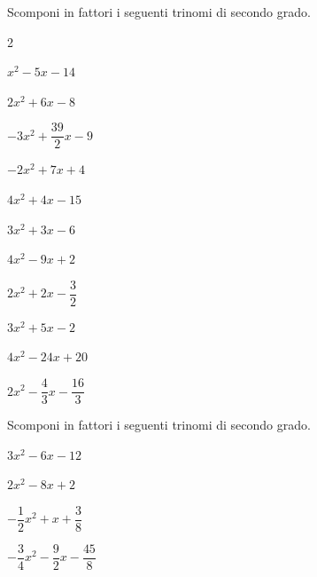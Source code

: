 \begin{esercizio}[*]
\label{ese:3.84}
Scomponi in fattori i seguenti trinomi di secondo grado.
\begin{htmulticols}{2}
\begin{enumeratea}
\item \(x^{2}-5 x-14\) 
\item \(2 x^{2} + 6 x-8\) 
\item \(- 3 x^{2} + \dfrac{39}{2} x-9\) 
\item \(- 2 x^{2} + 7 x + 4\) 
\item \(4 x^{2} + 4 x-15\) 
\item \(3 x^{2} + 3 x-6\) 
\item \(4 x^{2}-9 x + 2\) 
\item \(2 x^{2} + 2 x - \dfrac{3}{2}\) 
\item \(3 x^{2} + 5 x - 2\) 
\item \(4 x^{2}-24 x + 20\) 
\item \(2 x^{2}-\dfrac{4}{3} x - \dfrac{16}{3}\) 
\end{enumeratea}
\end{htmulticols}
\end{esercizio}

\begin{esercizio}[*]
\label{ese:3.87}
Scomponi in fattori i seguenti trinomi di secondo grado.
\begin{enumeratea}
\item \(3 x^{2}-6 x-12\) 
\item \(2 x^{2}-8 x + 2\) 
\item \(- \dfrac{1}{2} x^{2} + x + \dfrac{3}{8}\) 
\item \(- \dfrac{3}{4} x^{2}-\dfrac{9}{2} x - \dfrac{45}{8}\) 
\end{enumeratea}
\end{esercizio}

